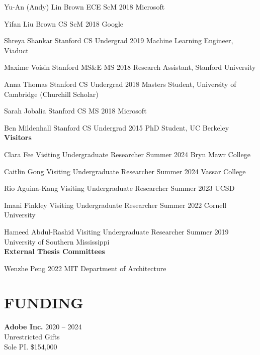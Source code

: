 \documentclass[line,margin]{res}
\begin{document}
\begin{resume}
\alumni
{Yu-An (Andy) Lin}
{Brown ECE ScM}
{2018}
{Microsoft}

\alumni
{Yifan Liu}
{Brown CS ScM}
{2018}
{Google}

\alumni
{Shreya Shankar}
{Stanford CS Undergrad}
{2019}
{Machine Learning Engineer, Viaduct}

\alumni
{Maxime Voisin}
{Stanford MS\&E MS}
{2018}
{Research Assistant, Stanford University}

\alumni
{Anna Thomas}
{Stanford CS Undergrad}
{2018}
{Masters Student, University of Cambridge (Churchill Scholar)}

\alumni
{Sarah Jobalia}
{Stanford CS MS}
{2018}
{Microsoft}

\alumni
{Ben Mildenhall}
{Stanford CS Undergrad}
{2015}
{PhD Student, UC Berkeley}
\\


\textbf{Visitors}

\visitor
{Clara Fee}
{Visiting Undergraduate Researcher}
{Summer 2024}
{Bryn Mawr College}

\visitor
{Caitlin Gong}
{Visiting Undergraduate Researcher}
{Summer 2024}
{Vassar College}

\visitor
{Rio Aguina-Kang}
{Visiting Undergraduate Researcher}
{Summer 2023}
{UCSD}

\visitor
{Imani Finkley}
{Visiting Undergraduate Researcher}
{Summer 2022}
{Cornell University}

\visitor
{Hameed Abdul-Rashid}
{Visiting Undergraduate Researcher}
{Summer 2019}
{University of Southern Mississippi}
\\


\textbf{External Thesis Committees}

\thesiscomm
{Wenzhe Peng}
{2022}
{MIT Department of Architecture}


\section{FUNDING}

\newcommand{\funding}[5] {
	\textbf{#1} \hfill #5\\
	#2 \\
	#3. #4
}

\funding
{Adobe Inc.}
{Unrestricted Gifts}
{Sole PI}
{\$154,000}
{2020 -- 2024}


\end{resume}
\end{document}
